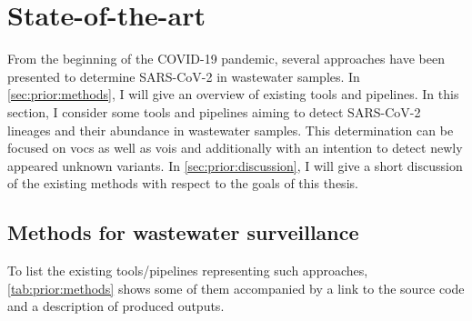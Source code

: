 %
\section{State-of-the-art}

From the beginning of the COVID-19 pandemic, several approaches have been presented to determine SARS-CoV-2 in wastewater samples. In \autoref{sec:prior:methods}, I will give an overview of existing tools and pipelines. In this section, I consider some tools and pipelines aiming to detect SARS-CoV-2 lineages and their abundance in wastewater samples. This determination can be focused on \acrfull{vocs} as well as \acrfull{vois} and additionally with an intention to detect newly appeared unknown variants. In \autoref{sec:prior:discussion}, I will give a short discussion of the existing methods with respect to the goals of this thesis.

    \subsection{Methods for wastewater surveillance} \label{sec:prior:methods}
    
    To list the existing tools/pipelines representing such approaches, \cref{tab:prior:methods} shows some of them accompanied by a link to the source code and a description of produced outputs.
        
